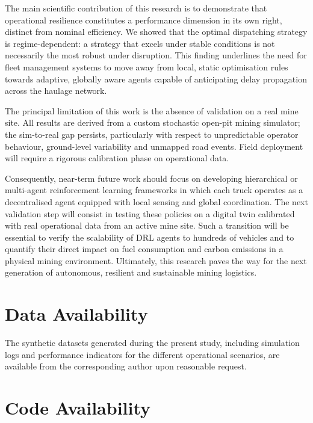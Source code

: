 \documentclass[11pt,a4paper]{article}
\begin{document}
The main scientific contribution of this research is to demonstrate that operational resilience constitutes a performance dimension in its own right, distinct from nominal efficiency. We showed that the optimal dispatching strategy is regime-dependent: a strategy that excels under stable conditions is not necessarily the most robust under disruption. This finding underlines the need for fleet management systems to move away from local, static optimisation rules towards adaptive, globally aware agents capable of anticipating delay propagation across the haulage network.

The principal limitation of this work is the absence of validation on a real mine site. All results are derived from a custom stochastic open-pit mining simulator; the sim-to-real gap persists, particularly with respect to unpredictable operator behaviour, ground-level variability and unmapped road events. Field deployment will require a rigorous calibration phase on operational data.

Consequently, near-term future work should focus on developing hierarchical or multi-agent reinforcement learning frameworks in which each truck operates as a decentralised agent equipped with local sensing and global coordination. The next validation step will consist in testing these policies on a digital twin calibrated with real operational data from an active mine site. Such a transition will be essential to verify the scalability of DRL agents to hundreds of vehicles and to quantify their direct impact on fuel consumption and carbon emissions in a physical mining environment. Ultimately, this research paves the way for the next generation of autonomous, resilient and sustainable mining logistics.

\newpage

\section*{Data Availability}

The synthetic datasets generated during the present study, including simulation logs and performance indicators for the different operational scenarios, are available from the corresponding author upon reasonable request.

\section*{Code Availability}
\end{document}
